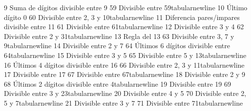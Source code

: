 {}9 \markdownRendererAmpersand{} Suma de dígitos divisible entre 9 \markdownRendererAmpersand{} 59 \markdownRendererAmpersand{} Divisible entre 59\markdownRendererBackslash{}tabularnewline\markdownRendererSoftLineBreak
{}10 \markdownRendererAmpersand{} Último dígito 0 \markdownRendererAmpersand{} 60 \markdownRendererAmpersand{} Divisible entre 2, 3 y 10\markdownRendererBackslash{}tabularnewline\markdownRendererSoftLineBreak
{}11 \markdownRendererAmpersand{} Diferencia pares/impares divisible entre 11 \markdownRendererAmpersand{} 61 \markdownRendererAmpersand{} Divisible entre 61\markdownRendererBackslash{}tabularnewline\markdownRendererSoftLineBreak
{}12 \markdownRendererAmpersand{} Divisible entre 3 y 4 \markdownRendererAmpersand{} 62 \markdownRendererAmpersand{} Divisible entre 2 y 31\markdownRendererBackslash{}tabularnewline\markdownRendererSoftLineBreak
{}13 \markdownRendererAmpersand{} Regla del 13 \markdownRendererAmpersand{} 63 \markdownRendererAmpersand{} Divisible entre 3, 7 y 9\markdownRendererBackslash{}tabularnewline\markdownRendererSoftLineBreak
{}14 \markdownRendererAmpersand{} Divisible entre 2 y 7 \markdownRendererAmpersand{} 64 \markdownRendererAmpersand{} Últimos 6 dígitos divisible entre 64\markdownRendererBackslash{}tabularnewline\markdownRendererSoftLineBreak
{}15 \markdownRendererAmpersand{} Divisible entre 3 y 5 \markdownRendererAmpersand{} 65 \markdownRendererAmpersand{} Divisible entre 5 y 13\markdownRendererBackslash{}tabularnewline\markdownRendererSoftLineBreak
{}16 \markdownRendererAmpersand{} Últimos 4 dígitos divisible entre 16 \markdownRendererAmpersand{} 66 \markdownRendererAmpersand{} Divisible entre 2, 3 y 11\markdownRendererBackslash{}tabularnewline\markdownRendererSoftLineBreak
{}17 \markdownRendererAmpersand{} Divisible entre 17 \markdownRendererAmpersand{} 67 \markdownRendererAmpersand{} Divisible entre 67\markdownRendererBackslash{}tabularnewline\markdownRendererSoftLineBreak
{}18 \markdownRendererAmpersand{} Divisible entre 2 y 9 \markdownRendererAmpersand{} 68 \markdownRendererAmpersand{} Últimos 2 dígitos divisible entre 4\markdownRendererBackslash{}tabularnewline\markdownRendererSoftLineBreak
{}19 \markdownRendererAmpersand{} Divisible entre 19 \markdownRendererAmpersand{} 69 \markdownRendererAmpersand{} Divisible entre 3 y 23\markdownRendererBackslash{}tabularnewline\markdownRendererSoftLineBreak
{}20 \markdownRendererAmpersand{} Divisible entre 4 y 5 \markdownRendererAmpersand{} 70 \markdownRendererAmpersand{} Divisible entre 2, 5 y 7\markdownRendererBackslash{}tabularnewline\markdownRendererSoftLineBreak
{}21 \markdownRendererAmpersand{} Divisible entre 3 y 7 \markdownRendererAmpersand{} 71 \markdownRendererAmpersand{} Divisible entre 71\markdownRendererBackslash{}tabularnewline\markdownRendererSoftLineBreak
